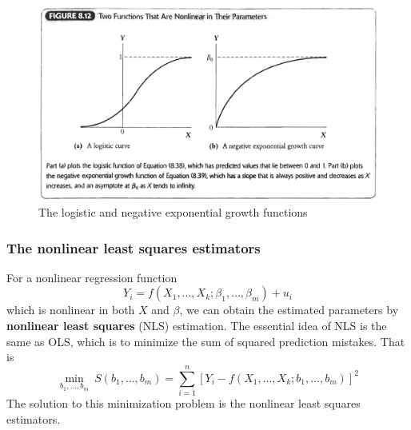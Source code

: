 \documentclass[a4paper,11pt]{article}
\begin{document}
\begin{figure}[htbp]
\centering
\includegraphics[width=.9\linewidth]{img/fig-8-12.png}
\caption{\label{fig:org8679f3e}
The logistic and negative exponential growth functions}
\end{figure}

\subsubsection*{The nonlinear least squares estimators}
\label{sec:org8bbad12}
For a nonlinear regression function
\[ Y_i = f(X_1, \ldots, X_k; \beta_1, \ldots, \beta_m) + u_i \]
which is nonlinear in both \(X\) and \(\beta\), we can obtain the
estimated parameters by \textbf{nonlinear least squares} (NLS) estimation. The
essential idea of NLS is the same as OLS, which is to minimize the sum
of squared prediction mistakes. That is
\begin{equation*}
\operatorname*{min}_{b_1, \ldots, b_m}\: S(b_1, \ldots, b_m) = \sum_{i=1}^n \left[ Y_i - f(X_1, \ldots, X_k; b_1, \ldots, b_m) \right]^2
\end{equation*}
The solution to this minimization problem is the nonlinear least
squares estimators.
\end{document}
